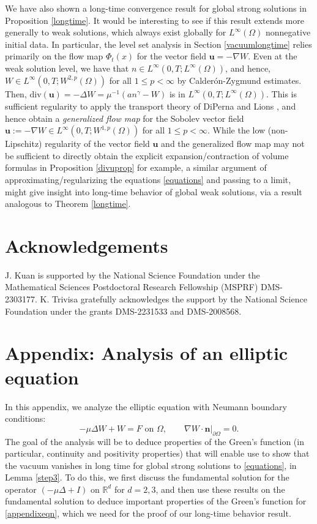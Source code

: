 \documentclass[12pt]{article}
\newcommand{\bd}{\boldsymbol}
\def\R{{\mathbb R}}
\theoremstyle{plain}
\begin{document}
We have also shown a long-time convergence result for global strong solutions in Proposition \ref{longtime}. It would be interesting to see if this result extends more generally to weak solutions, which always exist globally for $L^{\infty}(\Omega)$ nonnegative initial data. In particular, the level set analysis in Section \ref{vacuumlongtime} relies primarily on the flow map $\Phi_{t}(x)$ for the vector field $\bd{u} = -\nabla W$. Even at the weak solution level, we have that $n \in L^{\infty}(0, T; L^{\infty}(\Omega))$, and hence, $W \in L^{\infty}(0, T; W^{2, p}(\Omega))$ for all $1 \le p < \infty$ by Calder\'{o}n-Zygmund estimates. Then, $\text{div}(\bd{u}) = -\Delta W = \mu^{-1}(an^{\gamma} - W)$ is in $L^{\infty}(0, T; L^{\infty}(\Omega))$. This is sufficient regularity to apply the transport theory of DiPerna and Lions \cite{DeLellis, DiPernaLions}, and hence obtain a \textit{generalized flow map} for the Sobolev vector field $\bd{u} := -\nabla W \in L^{\infty}(0, T; W^{1, p}(\Omega))$ for all $1 \le p < \infty$. While the low (non-Lipschitz) regularity of the vector field $\bd{u}$ and the generalized flow map may not be sufficient to directly obtain the explicit expansion/contraction of volume formulas in Proposition \ref{divuprop} for example, a similar argument of approximating/regularizing the equations \eqref{equations} and passing to a limit, might give insight into long-time behavior of global weak solutions, via a result analogous to Theorem \ref{longtime}.

\section*{Acknowledgements}

J. Kuan is supported by the National Science Foundation under the Mathematical Sciences Postdoctoral Research Fellowship (MSPRF) DMS-2303177.
K. Trivisa gratefully acknowledges the support by the National Science Foundation under the grants DMS-2231533 and DMS-2008568.



\section{Appendix: Analysis of an elliptic equation}\label{appendix}

In this appendix, we analyze the elliptic equation with Neumann boundary conditions:
\begin{equation}\label{appendixeqn}
-\mu \Delta W + W = F \text{ on } \Omega, \qquad \nabla W \cdot \bd{n}|_{\partial \Omega} = 0.
\end{equation}
The goal of the analysis will be to deduce properties of the Green's function (in particular, continuity and positivity properties) that will enable use to show that the vacuum vanishes in long time for global strong solutions to \eqref{equations}, in Lemma \ref{step3}. To do this, we first discuss the fundamental solution for the operator $(-\mu \Delta + I)$ on $\R^{d}$ for $d = 2, 3$, and then use these results on the fundamental solution to deduce important properties of the Green's function for \eqref{appendixeqn}, which we need for the proof of our long-time behavior result.
\end{document}

